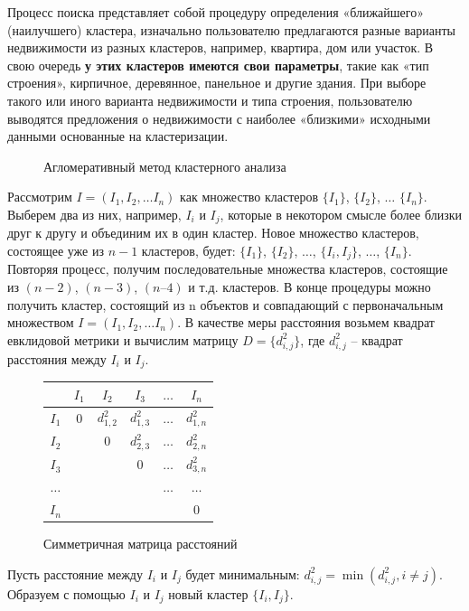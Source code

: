 \documentclass[a4paper,14pt,openany,final]{extreport} %
\def\oldcaption{} \let\oldcaption=\caption
\def\caption{\stepcounter{captionsnum}\oldcaption}
\begin{document}
Процесс поиска представляет собой процедуру определения «ближайшего» (наилучшего) кластера, изначально пользователю предлагаются разные варианты недвижимости из разных кластеров, например, квартира, дом или участок. В свою очередь\textbf{ у этих кластеров имеются свои параметры}, такие как «тип строения», кирпичное, деревянное, панельное и другие здания. При выборе такого или иного варианта недвижимости и типа строения, пользователю выводятся предложения о недвижимости с наиболее «близкими» исходными данными основанные на кластеризации.

\begin{figure}[htbp]
  \centering

  \caption{Агломеративный метод кластерного анализа}
  \label{fig:clusagloshow}
\end{figure}

Рассмотрим $Ι = (Ι_1, Ι_2, \ldots Ι_n)$ как множество кластеров $\{Ι_1\}$, $\{Ι_2\}$, $\ldots$ $\{Ι_n\}$. Выберем два из них, например, $Ι_i$ и $Ι_j$, которые в некотором смысле более близки друг к другу и объединим их в один кластер. Новое множество кластеров, состоящее уже из $n-1$ кластеров, будет: $\{Ι_1\}$, $\{Ι_2\}$, $\ldots$, $\{Ι_i , Ι_j\}$, $\ldots$, $\{Ι_n\}$. Повторяя процесс, получим последовательные множества кластеров, состоящие из $(n-2)$, $(n-3)$, $(n–4)$ и т.д. кластеров. В конце процедуры можно получить кластер, состоящий из n объектов и совпадающий с первоначальным множеством $Ι = (Ι_1, Ι_2, \ldots Ι_n)$. В качестве меры расстояния возьмем квадрат евклидовой метрики и вычислим матрицу $D= \{d_{i,j}^2 \}$, где $d_{i,j}^2$ -- квадрат расстояния между $Ι_i$ и $Ι_j$.

\begin{figure}[htbp]
  \centering
  \begin{tabular}{|c||c|c|c|c|c|}
    \hline
          & $I_1$ & $I_2$       & $I_3$       & $\ldots$ & $I_n$        \\
    \hline
    \hline
    $I_1$ & 0     & $d_{1,2}^2$ & $d_{1,3}^2$ & $\ldots$ & $d_{1,n}^2$  \\
    \hline
    $I_2$ &       & 0           & $d_{2,3}^2$ & $\ldots$ & $d_{2,n}^2$  \\
    \hline
    $I_3$ &       &             & 0           & $\ldots$ & $d_{3,n}^2$  \\
    \hline
 $\ldots$ &       &             &             & $\ldots$ & $\ldots$ \\
    \hline
    $I_n$ &       &             &             &          & 0  \\
    \hline
  \end{tabular}
  \caption{Симметричная матрица расстояний}
  \label{fig:disssimm}
\end{figure}
Пусть расстояние между $Ι_i$ и $Ι_j$ будет минимальным: $d_{i,j}^2=\min⁡(d_{i,j}^2,i\neq j)$. Образуем с помощью $Ι_i$ и $Ι_j$ новый кластер $\{Ι_i, Ι_j\}.$
\end{document}
